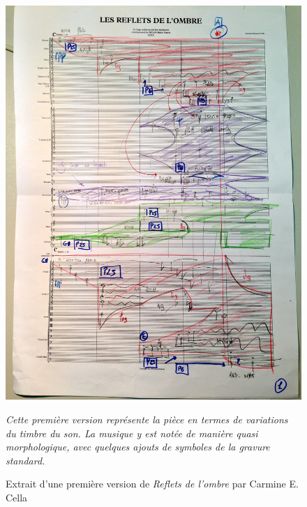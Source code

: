 \begin{figure}[!htbp]
	\centering
	\includegraphics[keepaspectratio=true, width=\textwidth, angle = -90]{Annexes/i/refletsDeLOmbreFantaisie.jpg}
	\caption{Extrait d'une première version de \textit{Reflets de l'ombre} par Carmine E. Cella}
	\medskip
	\small
	\textit{Cette première version représente la pièce en termes de variations du timbre du son.
	La musique y est notée de manière quasi morphologique, avec quelques ajouts de symboles de la gravure standard.}	
	\label{fig:refletsDeLOmbreFantaisie}
\end{figure}

